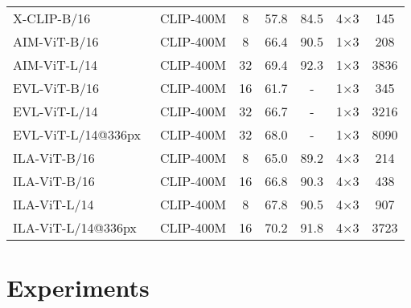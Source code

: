 \documentclass[10pt,twocolumn,letterpaper]{article}
\begin{document}
\begin{table*}[htbp]
\begin{center}
{\begin{tabular}{lcccccc}
X-CLIP-B/16~\cite{b24}                 & CLIP-400M                        & 8              & 57.8                    & 84.5                    & 4×3                     & 145               \\
AIM-ViT-B/16~\cite{yang2023aim}        & {CLIP-400M} & 8               & 66.4                    & 90.5                    & {1×3} & 208               \\
AIM-ViT-L/14~\cite{yang2023aim}        & {CLIP-400M} & 32              & 69.4                    & 92.3                    & {1×3} & 3836              \\
EVL-ViT-B/16~\cite{b25}        & CLIP-400M                     & 16              & 61.7                    & -                       & 1×3                     & 345               \\
EVL-ViT-L/14~\cite{b25}        & CLIP-400M                     & 32              & 66.7                    & -                       & 1×3                     & 3216              \\
EVL-ViT-L/14@336px~\cite{b25}  & CLIP-400M                     & 32              & 68.0                    & -                       & 1×3                     & 8090              \\
\midrule
ILA-ViT-B/16       & CLIP-400M                     & 8               & 65.0                    & 89.2                    & 4×3                     & 214               \\
ILA-ViT-B/16       & CLIP-400M                     & 16              & 66.8                    & 90.3                    & 4×3                     & 438               \\
ILA-ViT-L/14       & CLIP-400M                     & 8               & 67.8                    & 90.5                    & 4×3                     & 907               \\
ILA-ViT-L/14@336px & CLIP-400M                     & 16              &    70.2             &    91.8                 & 4×3                     & 3723              \\
\bottomrule
\end{tabular}
}
\end{center}
\label{table:2}
\vspace{-0.1cm}
\end{table*}

\section{Experiments}
\end{document}

